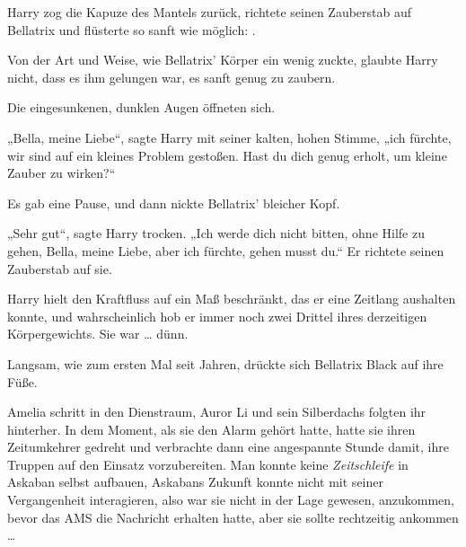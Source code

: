 Harry zog die Kapuze des Mantels zurück, richtete seinen Zauberstab auf Bellatrix und flüsterte so sanft wie möglich: .

Von der Art und Weise, wie Bellatrix’ Körper ein wenig zuckte, glaubte Harry nicht, dass es ihm gelungen war, es sanft genug zu zaubern.

Die eingesunkenen, dunklen Augen öffneten sich.

„Bella, meine Liebe“, sagte Harry mit seiner kalten, hohen Stimme, „ich fürchte, wir sind auf ein kleines Problem gestoßen. Hast du dich genug erholt, um kleine Zauber zu wirken?“

Es gab eine Pause, und dann nickte Bellatrix’ bleicher Kopf.

„Sehr gut“, sagte Harry trocken.
„Ich werde dich nicht bitten, ohne Hilfe zu gehen, Bella, meine Liebe, aber ich fürchte, gehen musst du.“ Er richtete seinen Zauberstab auf sie. 

Harry hielt den Kraftfluss auf ein Maß beschränkt, das er eine Zeitlang aushalten konnte, und wahrscheinlich hob er immer noch zwei Drittel ihres derzeitigen Körpergewichts. Sie war … dünn.

Langsam, wie zum ersten Mal seit Jahren, drückte sich Bellatrix Black auf ihre Füße.

\later

Amelia schritt in den Dienstraum, Auror Li und sein Silberdachs folgten ihr hinterher. In dem Moment, als sie den Alarm gehört hatte, hatte sie ihren Zeitumkehrer gedreht und verbrachte dann eine angespannte Stunde damit, ihre Truppen auf den Einsatz vorzubereiten. Man konnte keine \emph{Zeitschleife} in Askaban selbst aufbauen, Askabans Zukunft konnte nicht mit seiner Vergangenheit interagieren, also war sie nicht in der Lage gewesen, anzukommen, bevor das AMS die Nachricht erhalten hatte, aber sie sollte rechtzeitig ankommen …

